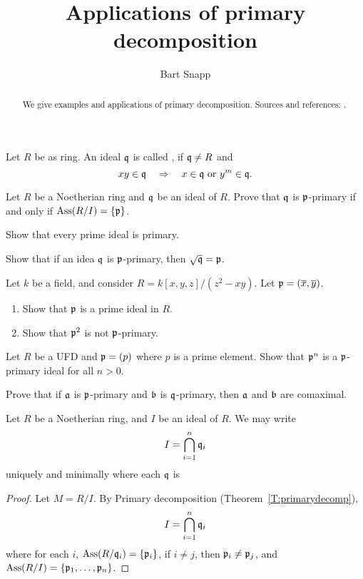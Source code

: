 \documentclass{ximera}
\author{Bart Snapp}
\title{Applications of primary decomposition}
\begin{document}
\begin{abstract}
  We give examples and applications of primary decomposition. Sources
  and references: \cite{AM1969, sD2008, dE1995}.
\end{abstract}
\maketitle



\begin{definition}
  Let $R$ be as ring. An ideal $\mathfrak{q}$ is called , if $\mathfrak{q}\ne
  R$ and
  \[
  xy\in\mathfrak{q} \quad \Rightarrow \quad x\in\mathfrak{q}\text{ or }y^m\in\mathfrak{q}.
  \]
\end{definition}

\begin{exercise}
  Let $R$ be a Noetherian ring and $\mathfrak{q}$ be an ideal of $R$. Prove that
  $\mathfrak{q}$ is $\mathfrak{p}$-primary if and only if $\operatorname{Ass}(R/I) = \{\mathfrak{p}\}$.
\end{exercise}

\begin{exercise}
  Show that every prime ideal is primary.
\end{exercise}

\begin{exercise}
  Show that if an idea $\mathfrak{q}$ is $\mathfrak{p}$-primary, then $\sqrt{\mathfrak{q}} = \mathfrak{p}$.
\end{exercise}

\begin{exercise}
  Let $k$ be a field, and consider $R=k[x,y,z]/(z^2-xy)$. Let $\mathfrak{p} = (\overline{x},\overline{y})$.
  \begin{enumerate}
  \item Show that $\mathfrak{p}$ is a prime ideal in $R$.
  \item Show that $\mathfrak{p}^2$ is not $\mathfrak{p}$-primary.
  \end{enumerate}
\end{exercise}

\begin{exercise}
  Let $R$ be a UFD and $\mathfrak{p} = (p)$ where $p$ is a prime element. Show
  that $\mathfrak{p}^n$ is a $\mathfrak{p}$-primary ideal for all $n>0$.
\end{exercise}

\begin{exercise}
  Prove that if $\mathfrak{a}$ is $\mathfrak{p}$-primary and $\mathfrak{b}$ is $\mathfrak{q}$-primary, then
  $\mathfrak{a}$ and $\mathfrak{b}$ are comaximal.
\end{exercise}



\begin{theorem}
  Let $R$ be a Noetherian ring, and $I$ be an ideal of $R$. We may write
  \[
  I = \bigcap_{i=1}^n \mathfrak{q}_i
  \]
  uniquely and minimally where each $\mathfrak{q}$ is 
  \begin{proof}
    Let $M = R/I$. By Primary decomposition (Theorem~\ref{T:primarydecomp}),
    \[
    I = \bigcap_{i=1}^n \mathfrak{q}_i
    \]
    where for each $i$, $\operatorname{Ass}(R/\mathfrak{q}_i) = \{\mathfrak{p}_i\}$, if $i\ne j$, then
    $\mathfrak{p}_i\ne\mathfrak{p}_j$, and $\operatorname{Ass}(R/I) = \{\mathfrak{p}_1,\dots,\mathfrak{p}_n\}$.
  \end{proof}
\end{theorem}
\end{document}

